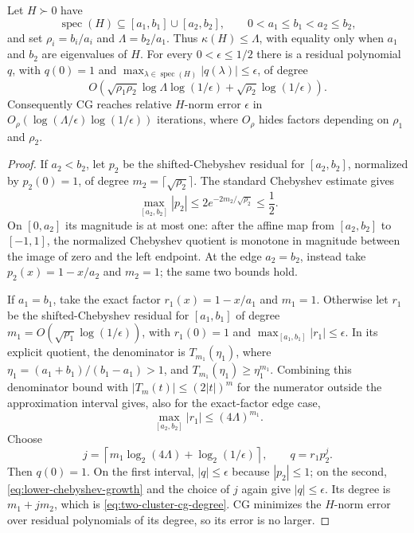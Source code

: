 \begin{proposition}
\label{prop:two-cluster-cg}
Let $H\succ0$ have
\[
 \operatorname{spec}(H)\subseteq[a_1,b_1]\cup[a_2,b_2],
 \qquad 0<a_1\leq b_1<a_2\leq b_2,
\]
and set $\rho_i=b_i/a_i$ and $\Lambda=b_2/a_1$.  Thus
$\kappa(H)\leq\Lambda$, with equality only when $a_1$ and $b_2$ are
eigenvalues of $H$.  For every $0<\epsilon\leq1/2$ there is a residual
polynomial $q$, with $q(0)=1$ and
$\max_{\lambda\in\operatorname{spec}(H)}|q(\lambda)|\leq\epsilon$, of
degree
\begin{equation}
 O\!\left(
  \sqrt{\rho_1\rho_2}\log\Lambda\log(1/\epsilon)
  +\sqrt{\rho_2}\log(1/\epsilon)
 \right).
 \label{eq:two-cluster-cg-degree}
\end{equation}
Consequently CG reaches relative $H$-norm error $\epsilon$ in
$O_\rho(\log(\Lambda/\epsilon)\log(1/\epsilon))$ iterations, where $O_\rho$
hides factors depending on $\rho_1$ and $\rho_2$.
\end{proposition}

\begin{proof}
If $a_2<b_2$, let $p_2$ be the shifted-Chebyshev residual for $[a_2,b_2]$,
normalized by $p_2(0)=1$, of degree
$m_2=\lceil\sqrt{\rho_2}\rceil$.  The standard Chebyshev estimate gives
\[
 \max_{[a_2,b_2]}|p_2|
 \leq2e^{-2m_2/\sqrt{\rho_2}}\leq\frac12.
\]
On $[0,a_2]$ its magnitude is at most one: after the affine map from
$[a_2,b_2]$ to $[-1,1]$, the normalized Chebyshev quotient is monotone in
magnitude between the image of zero and the left endpoint.  At the edge
$a_2=b_2$, instead take $p_2(x)=1-x/a_2$ and $m_2=1$; the same two bounds
hold.

If $a_1=b_1$, take the exact factor $r_1(x)=1-x/a_1$ and $m_1=1$.
Otherwise let $r_1$ be the shifted-Chebyshev residual for $[a_1,b_1]$ of
degree $m_1=O(\sqrt{\rho_1}\log(1/\epsilon))$, with $r_1(0)=1$ and
$\max_{[a_1,b_1]}|r_1|\leq\epsilon$.  In its explicit quotient, the
denominator is $T_{m_1}(\eta_1)$, where
$\eta_1=(a_1+b_1)/(b_1-a_1)>1$, and
$T_{m_1}(\eta_1)\geq\eta_1^{m_1}$.  Combining this denominator bound with
$|T_m(t)|\leq(2|t|)^m$ for the numerator outside the approximation interval
gives, also for the exact-factor edge case,
\begin{equation}
 \max_{[a_2,b_2]}|r_1|\leq(4\Lambda)^{m_1}.
 \label{eq:lower-chebyshev-growth}
\end{equation}
Choose
\[
 j=\left\lceil m_1\log_2(4\Lambda)+\log_2(1/\epsilon)\right\rceil,
 \qquad q=r_1p_2^j.
\]
Then $q(0)=1$.  On the first interval, $|q|\leq\epsilon$ because
$|p_2|\leq1$; on the second, \eqref{eq:lower-chebyshev-growth} and the
choice of $j$ again give $|q|\leq\epsilon$.  Its degree is
$m_1+jm_2$, which is \eqref{eq:two-cluster-cg-degree}.  CG minimizes the
$H$-norm error over residual polynomials of its degree, so its error is no
larger.
\end{proof}

